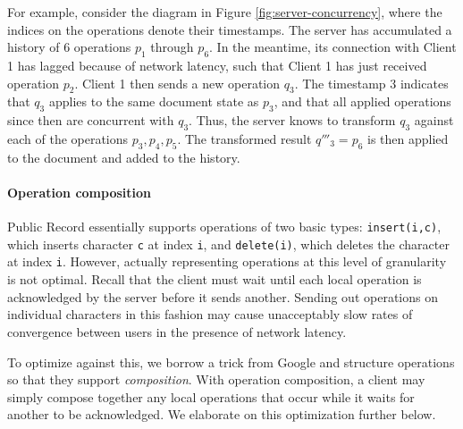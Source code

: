 \documentclass[letterpaper,11pt,twocolumn]{article}
\newcommand{\code}[1]{\texttt{\small #1}}
\begin{document}
For example, consider the diagram in Figure \ref{fig:server-concurrency}, where the indices on the operations denote their timestamps.  The server has accumulated a history of 6 operations $p_1$ through $p_6$.  In the meantime, its connection with Client 1 has lagged because of network latency, such that Client 1 has just received operation $p_2$.  Client 1 then sends a new operation $q_3$.  The timestamp 3 indicates that $q_3$ applies to the same document state as $p_3$, and that all applied operations since then are concurrent with $q_3$.  Thus, the server knows to transform $q_3$ against each of the operations $p_3, p_4, p_5$.  The transformed result $q'''_3 = p_6$ is then applied to the document and added to the history.


\paragraph*{Operation composition} 
Public Record essentially supports operations of two basic types: \code{insert(i,c)}, which inserts character \code{c} at index \code{i}, and \code{delete(i)}, which deletes the character at index \code{i}.  However, actually representing operations at this level of granularity is not optimal. Recall that the client must wait until each local operation is acknowledged by the server before it sends another.  Sending out operations on individual characters in this fashion may cause unacceptably slow rates of convergence between users in the presence of network latency.  

To optimize against this, we borrow a trick from Google \cite{S} and structure operations so that they support \emph{composition}.  With operation composition, a client may simply compose together any local operations that occur while it waits for another to be acknowledged.  We elaborate on this optimization further below.

%	
%		
%		
\end{document}
